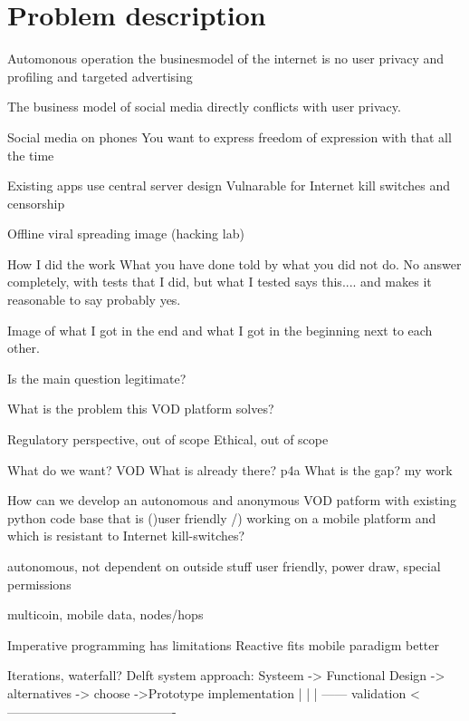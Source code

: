 \chapter{Problem description}



Automonous operation
the businesmodel of the internet is no user privacy and profiling and targeted advertising



The business model of social media directly conflicts with user privacy. %

Social media on phones
You want to express freedom of expression with that all the time %



Existing apps use central server design
Vulnarable for Internet kill switches and censorship

Offline viral spreading image (hacking lab)


How I did the work
What you have done told by what you did not do.
No answer completely, with tests that I did, but what I tested says this.... and makes it reasonable to say probably yes.


Image of what I got in the end and what I got in the beginning next to each other.


Is the main question legitimate?


What is the problem this VOD platform solves?


Regulatory perspective, out of scope
Ethical, out of scope


What do we want? VOD
What is already there? p4a
What is the gap? my work

How can we develop an autonomous and anonymous VOD patform with existing python code base that is ()user friendly /) working on a mobile platform and which is resistant to Internet kill-switches?

autonomous, not dependent on outside stuff
user friendly, power draw, special permissions

multicoin, mobile data, nodes/hops



Imperative programming has limitations
Reactive fits mobile paradigm better


Iterations, waterfall?
Delft system approach:
Systeem -> Functional Design -> alternatives -> choose ->Prototype implementation
																									 |
|																									|
------			 validation				 <----------------------------------------

